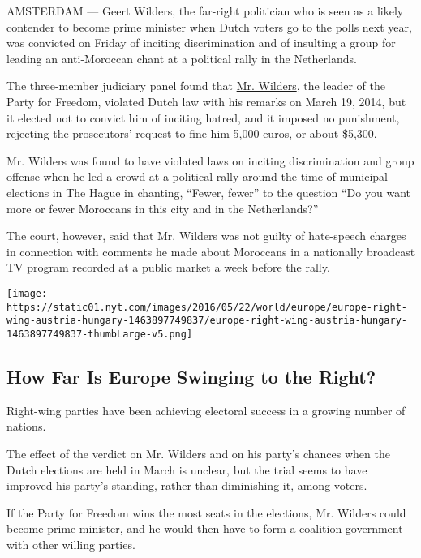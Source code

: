 AMSTERDAM --- Geert Wilders, the far-right politician who is seen as a
likely contender to become prime minister when Dutch voters go to the
polls next year, was convicted on Friday of inciting discrimination and
of insulting a group for leading an anti-Moroccan chant at a political
rally in the Netherlands.

The three-member judiciary panel found that
\href{http://www.nytimes.com/2016/11/01/world/europe/geert-wilders-netherlands-hate-trial.html}{Mr.
Wilders}, the leader of the Party for Freedom, violated Dutch law with
his remarks on March 19, 2014, but it elected not to convict him of
inciting hatred, and it imposed no punishment, rejecting the
prosecutors' request to fine him 5,000 euros, or about \$5,300.

Mr. Wilders was found to have violated laws on inciting discrimination
and group offense when he led a crowd at a political rally around the
time of municipal elections in The Hague in chanting, ``Fewer, fewer''
to the question ``Do you want more or fewer Moroccans in this city and
in the Netherlands?''

The court, however, said that Mr. Wilders was not guilty of hate-speech
charges in connection with comments he made about Moroccans in a
nationally broadcast TV program recorded at a public market a week
before the rally.

\href{https://www.nytimes.com/interactive/2016/05/22/world/europe/europe-right-wing-austria-hungary.html}{}

\texttt{[image: https://static01.nyt.com/images/2016/05/22/world/europe/europe-right-wing-austria-hungary-1463897749837/europe-right-wing-austria-hungary-1463897749837-thumbLarge-v5.png]}

\hypertarget{how-far-is-europe-swinging-to-the-right}{%
\subsection{How Far Is Europe Swinging to the
Right?}\label{how-far-is-europe-swinging-to-the-right}}

Right-wing parties have been achieving electoral success in a growing
number of nations.

The effect of the verdict on Mr. Wilders and on his party's chances when
the Dutch elections are held in March is unclear, but the trial seems to
have improved his party's standing, rather than diminishing it, among
voters.

If the Party for Freedom wins the most seats in the elections, Mr.
Wilders could become prime minister, and he would then have to form a
coalition government with other willing parties.

